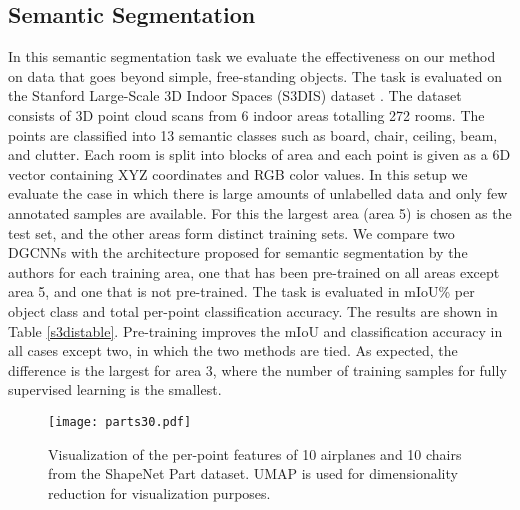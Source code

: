 \documentclass{article}
\begin{document}
\subsection{Semantic Segmentation}

In this semantic segmentation task we evaluate the effectiveness on our method on data that goes beyond simple, free-standing objects. The task is evaluated on the Stanford Large-Scale 3D Indoor Spaces (S3DIS) dataset \cite{s3dis}. The dataset consists of 3D point cloud scans from 6 indoor areas totalling 272 rooms. The points are classified into 13 semantic classes such as board, chair, ceiling, beam, and clutter. Each room is split into blocks of  area and each point is given as a 6D vector containing XYZ coordinates and RGB color values. In this setup we evaluate the case in which there is large amounts of unlabelled data and only few annotated samples are available. For this the largest area (area 5) is chosen as the test set, and the other areas form distinct training sets. We compare two DGCNNs with the architecture proposed for semantic segmentation by the authors for each training area, one that has been pre-trained on all areas except area 5, and one that is not pre-trained. The task is evaluated in mIoU\% per object class and total per-point classification accuracy. The results are shown in Table \ref{s3distable}. Pre-training improves the mIoU and classification accuracy in all cases except two, in which the two methods are tied. As expected, the difference is the largest for area 3, where the number of training samples for fully supervised learning is the smallest.

\begin{figure}[t]
\vskip -0.2in
\begin{center}
\centering
\texttt{[image: parts30.pdf]}
\vskip -0.1in
\caption{Visualization of the per-point features of 10 airplanes and 10 chairs from the ShapeNet Part dataset. UMAP is used for dimensionality reduction for visualization purposes.}
\label{parts}
\vskip -0.30in
\end{center}
\end{figure}
\end{document}
